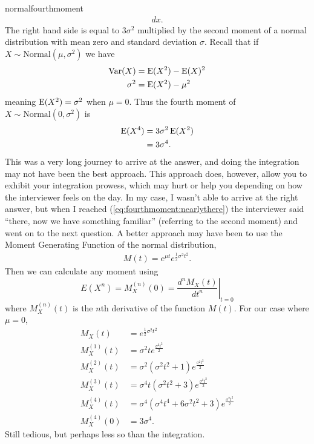 \begin{answer}{normalfourthmoment}
\begin{align*}
{  dx
}
\text{.}
\end{align*}
The right hand side is equal to $3\sigma^2$ multiplied by the second moment of a normal distribution with mean zero and standard deviation $\sigma$.
Recall that if $X \sim \text{Normal}(\mu, \sigma^2)$ we have
\begin{align*}
  \operatorname{\mathrm{Var}}(X) &= \operatorname{\mathrm{E}}(X^2) - \operatorname{\mathrm{E}}(X)^2 \\
\sigma^2  &= \operatorname{\mathrm{E}}(X^2) - \mu^2
\end{align*}
meaning
$ \operatorname{\mathrm{E}}(X^2) = \sigma^2 $
when
$\mu=0$.
Thus the fourth moment of
$X \sim \text{Normal}\left(0, \sigma^2\right)$ is
\begin{align*}
\operatorname{\mathrm{E}}(X^4)
&=
3 \sigma^2 \operatorname{\mathrm{E}}(X^2)
\\&=
3 \sigma^4
\text{.}
\end{align*}
This was a very long journey to arrive at the answer, and doing the integration may not have been the best approach.
This approach does, however, allow you to exhibit your integration prowess, which may hurt or help you depending on how the interviewer feels on the day.
In my case, I wasn't able to arrive at the right answer, but when I reached  (\ref{eq:fourthmoment:nearlythere}) the interviewer said ``there, now we have something familiar'' (referring to the second moment) and went on to the next question.
A better approach may have been to use the Moment Generating Function of the normal distribution,
\begin{align*}
  M(t) =
  e^{\mu t}
  e^{\frac{1}{2}\sigma^2 t^2}
  \text{.}
\end{align*}
Then we can calculate any moment using
\[
E \left( X^n \right) = M_X^{(n)}(0) = \left. \frac{d^n M_X (t)}{dt^n}\right|_{t=0}
\]
where $M_X^{(n)}(t)$ is the $n$th derivative of the function $M(t)$.
For our case where $\mu=0$,
\begin{align*}
  M_X(t) &=
  e^{\frac{1}{2}\sigma^2 t^2}\\
M_X^{(1)}(t) &=
\sigma^{2} t e^{\frac{\sigma^{2} t^{2}}{2}}
\\
M_X^{(2)}(t) &=
\sigma^{2} \left(\sigma^{2} t^{2} + 1\right) e^{\frac{\sigma^{2} t^{2}}{2}}
\\
M_X^{(3)}(t) &=
\sigma^{4} t \left(\sigma^{2} t^{2} + 3\right) e^{\frac{\sigma^{2} t^{2}}{2}}
\\
M_X^{(4)}(t) &=
\sigma^{4} \left(\sigma^{4} t^{4} + 6 \sigma^{2} t^{2} + 3\right) e^{\frac{\sigma^{2} t^{2}}{2}}
\\
M_X^{(4)}(0) &=
3\sigma^{4}
\text{.}
\end{align*}
Still tedious, but perhaps less so than the integration.%

\end{answer}

